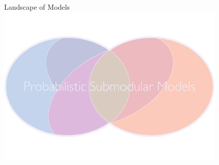 \begin{frame}{Landscape of Models}
\vspace{0.5em}
\centering
\includegraphics[width=4.3in]{figures/venn08.pdf}
\end{frame}
